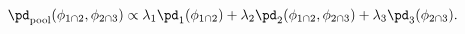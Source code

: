 \begin{equation}
  \pd_{\text{pool}}(\phi_{1 \cap 2}, \phi_{2 \cap 3}) \propto 
    \lambda_{1} \pd_{1}(\phi_{1 \cap 2}) + 
    \lambda_{2} \pd_{2}(\phi_{1 \cap 2}, \phi_{2 \cap 3}) + 
    \lambda_{3} \pd_{3}(\phi_{2 \cap 3}).  
  \label{eqn:linear-pooling}
\end{equation}
